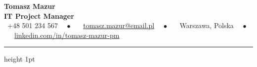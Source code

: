 \documentclass[10pt, a4paper]{article}
\begin{document}
\begin{center}
  {\Huge\bfseries\color{primary} Tomasz Mazur} \\[4pt]
  {\large\bfseries\color{accent} IT Project Manager} \\[8pt]
  \small\color{text}
  \faPhone \ +48 501 234 567 \ \ $\bullet$ \ \ 
  \faEnvelope \ \href{mailto:tomasz.mazur@email.pl}{tomasz.mazur@email.pl} \ \ $\bullet$ \ \ 
  \faMapMarker \ Warszawa, Polska \ \ $\bullet$ \ \ 
  \faLinkedin \ \href{https://linkedin.com/in/tomasz-mazur-pm}{linkedin.com/in/tomasz-mazur-pm}
\end{center}

\vspace{-4pt}
{\color{lightgray}\hrule height 1pt}
\vspace{10pt}

\end{document}

